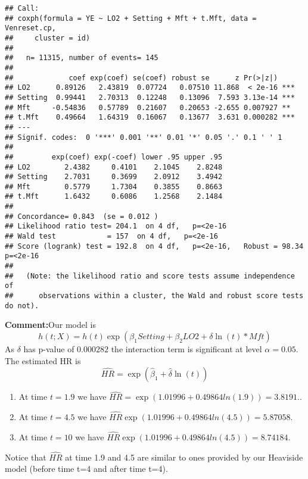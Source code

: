 \documentclass[
]{article}
\begin{document}
\begin{verbatim}
## Call:
## coxph(formula = YE ~ LO2 + Setting + Mft + t.Mft, data = Venreset.cp, 
##     cluster = id)
## 
##   n= 11315, number of events= 145 
## 
##             coef exp(coef) se(coef) robust se      z Pr(>|z|)    
## LO2      0.89126   2.43819  0.07724   0.07510 11.868  < 2e-16 ***
## Setting  0.99441   2.70313  0.12248   0.13096  7.593 3.13e-14 ***
## Mft     -0.54836   0.57789  0.21607   0.20653 -2.655 0.007927 ** 
## t.Mft    0.49664   1.64319  0.16067   0.13677  3.631 0.000282 ***
## ---
## Signif. codes:  0 '***' 0.001 '**' 0.01 '*' 0.05 '.' 0.1 ' ' 1
## 
##         exp(coef) exp(-coef) lower .95 upper .95
## LO2        2.4382     0.4101    2.1045    2.8248
## Setting    2.7031     0.3699    2.0912    3.4942
## Mft        0.5779     1.7304    0.3855    0.8663
## t.Mft      1.6432     0.6086    1.2568    2.1484
## 
## Concordance= 0.843  (se = 0.012 )
## Likelihood ratio test= 204.1  on 4 df,   p=<2e-16
## Wald test            = 157  on 4 df,   p=<2e-16
## Score (logrank) test = 192.8  on 4 df,   p=<2e-16,   Robust = 98.34  p=<2e-16
## 
##   (Note: the likelihood ratio and score tests assume independence of
##      observations within a cluster, the Wald and robust score tests do not).
\end{verbatim}

\textbf{Comment:}Our model is \[
h(t;X)=h(t)\exp(\beta_1 Setting + \beta_2 LO2 + \delta \ln(t)*Mft )
\] As \(\delta\) has p-value of \(0.000282\) the interaction term is
significant at level \(\alpha=0.05\). The estimated HR is \[
\hat{HR}=\exp(\hat{\beta}_1 + \hat{\delta} \ln(t))
\]

\begin{enumerate}
\item[] At time $t=1.9$ we have $\hat{HR}=\exp(1.01996+0.49864ln(1.9))=3.8191.$.
\item[] At time $t=4.5$ we have $\hat{HR}\exp(1.01996+0.49864ln(4.5))=5.87058.$
\item[] At time $t=10$ we have $\hat{HR}\exp(1.01996+0.49864ln(4.5))=8.74184.$
\end{enumerate}

Notice that \(\hat{HR}\) at time 1.9 and 4.5 are similar to ones
provided by our Heaviside model (before time t=4 and after time t=4).
\end{document}
